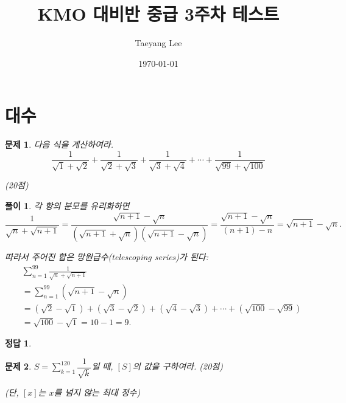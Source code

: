 \documentclass[12pt,a4paper]{article}
\title{KMO 대비반 중급 3주차 테스트}
\author{Taeyang Lee}
\date{\today}
\theoremstyle{test_form}
\newtheorem{problem}{문제}[section]
\newtheorem*{solution}{풀이}
\newtheorem*{answer}{정답}
\begin{document}
\maketitle
\tableofcontents  %

\newpage

\section{대수}

\begin{problem}

다음 식을 계산하여라.
\[
\frac{1}{\sqrt{1}+\sqrt{2}}+\frac{1}{\sqrt{2}+\sqrt{3}}+\frac{1}{\sqrt{3}+\sqrt{4}}+\cdots+\frac{1}{\sqrt{99}+\sqrt{100}}
\]
\begin{flushright}(20점)\end{flushright}

\end{problem}

\begin{solution}
\setlength{\parindent}{0pt}

각 항의 분모를 유리화하면
\[
\frac{1}{\sqrt{n}+\sqrt{n+1}}=\frac{\sqrt{n+1}-\sqrt{n}}{(\sqrt{n+1}+\sqrt{n})(\sqrt{n+1}-\sqrt{n})}=\frac{\sqrt{n+1}-\sqrt{n}}{(n+1)-n}=\sqrt{n+1}-\sqrt{n}.
\]

따라서 주어진 합은 망원급수(telescoping series)가 된다:
\[
\begin{aligned}
&\sum_{n=1}^{99}\frac{1}{\sqrt{n}+\sqrt{n+1}}\\
&=\sum_{n=1}^{99}(\sqrt{n+1}-\sqrt{n})\\
&=(\sqrt{2}-\sqrt{1})+(\sqrt{3}-\sqrt{2})+(\sqrt{4}-\sqrt{3})+\cdots+(\sqrt{100}-\sqrt{99})\\
&=\sqrt{100}-\sqrt{1}=10-1=9.
\end{aligned}
\]
\end{solution}

\begin{answer}
\hfill {}
\end{answer}

\newpage

\begin{problem}

\(S=\displaystyle\sum_{k=1}^{120}\dfrac{1}{\sqrt{k}}\)일 때, \([S]\)의 값을 구하여라. (20점)

\begin{flushright}(단, \([x]\)는 \(x\)를 넘지 않는 최대 정수)\end{flushright}

\end{problem}
\end{document}
